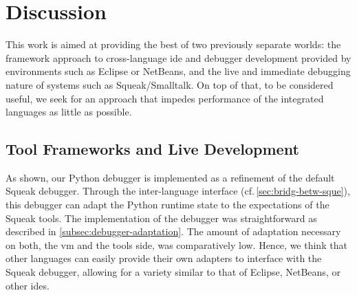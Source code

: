 \documentclass[sigconf,english]{acmart}
\newcommand{\ac}[1]{\gls*{#1}}
\newcommand{\acp}[1]{\glspl*{#1}}
\newcommand{\cf}[1]{cf.\,{#1}\xspace}
\newcommand*\Squeak{Squeak\slash Smalltalk\xspace}
\begin{document}
\section{Discussion}
\label{sec:discussion}

This work is aimed at providing the best of two previously separate worlds: the
framework approach to cross-language \ac{ide} and debugger development provided
by environments such as Eclipse or NetBeans, and the live and immediate
debugging nature of systems such as \Squeak. On top of that, to be considered
useful, we seek for an approach that impedes performance of the integrated
languages as little as possible.



\subsection{Tool Frameworks and Live Development}
As shown, our Python debugger is implemented as a refinement of the default
Squeak debugger. Through the inter-language interface
(\cf{\autoref{sec:bridg-betw-sque}}), this debugger can adapt the Python
runtime state to the expectations of the Squeak tools. The implementation of
the debugger was straightforward as described in
\autoref{subsec:debugger-adaptation}. The amount of adaptation necessary on
both, the \ac{vm} and the tools side, was comparatively low.
Hence, we think that other languages can easily provide their own adapters to
interface with the Squeak debugger, allowing for a variety similar to that of
Eclipse, NetBeans, or other \acp{ide}.
\end{document}
